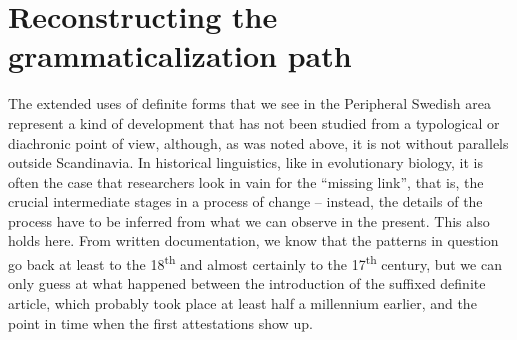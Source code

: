 \begin{stylecaption}

\end{stylecaption}

\begin{figure}[h]

\begin{minipage}{6.5835in}

\end{minipage}

\end{figure}

\begin{stylecaption}
  [Warning: Image ignored] %
 

\end{stylecaption}

\begin{figure}[h]

\begin{minipage}{6.5835in}

\end{minipage}

\end{figure}

\section{Reconstructing the grammaticalization path}
\label{bkm:Ref154983462}
\begin{styleBodyTextFirst}
The extended uses of definite forms that we see in the Peripheral Swedish area represent a kind of development that has not been studied from a typological or diachronic point of view, although, as was noted above, it is not without parallels outside Scandinavia. In historical linguistics, like in evolutionary biology, it is often the case that researchers look in vain for the “missing link”, that is, the crucial intermediate stages in a process of change – instead, the details of the process have to be inferred from what we can observe in the present. This also holds here. From written documentation, we know that the patterns in question go back at least to the 18\textsuperscript{th} and almost certainly to the 17\textsuperscript{th} century, but we can only guess at what happened between the introduction of the suffixed definite article, which probably took place at least half a millennium earlier, and the point in time when the first attestations show up. 

\end{styleBodyTextFirst}

